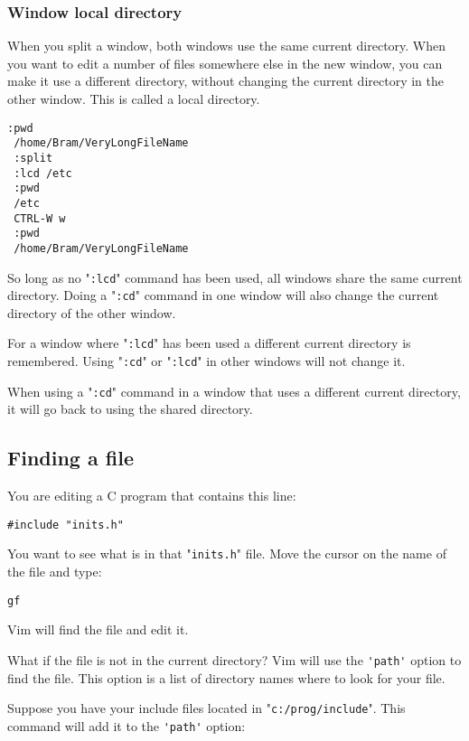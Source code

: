 \subsubsection{Window local directory}
When you split a window, both windows use the same current directory.
When you want to edit a number of files somewhere else in the new window, you can make it use a different directory, without changing the current directory in the other window.
This is called a local directory.

\begin{Verbatim}[samepage=true]
 :pwd
 /home/Bram/VeryLongFileName
 :split
 :lcd /etc
 :pwd
 /etc
 CTRL-W w
 :pwd
 /home/Bram/VeryLongFileName
\end{Verbatim}

So long as no "\verb!:lcd!" command has been used, all windows share the same current directory.
Doing a "\verb!:cd!" command in one window will also change the current directory of the other window.

For a window where "\verb!:lcd!" has been used a different current directory is remembered.
Using "\verb!:cd!" or "\verb!:lcd!" in other windows will not change it.

When using a "\verb!:cd!" command in a window that uses a different current directory, it will go back to using the shared directory.
\subsection{Finding a file}
You are editing a C program that contains this line:

\begin{Verbatim}[samepage=true]
    #include "inits.h" 
\end{Verbatim}

You want to see what is in that "\verb!inits.h!" file.
Move the cursor on the name of the file and type:

\begin{Verbatim}[samepage=true]
 gf
\end{Verbatim}

Vim will find the file and edit it.

What if the file is not in the current directory?  Vim will use the \verb!'path'! option to find the file.
This option is a list of directory names where to look for your file.

Suppose you have your include files located in "\verb!c:/prog/include!".
This command will add it to the \verb!'path'! option:

